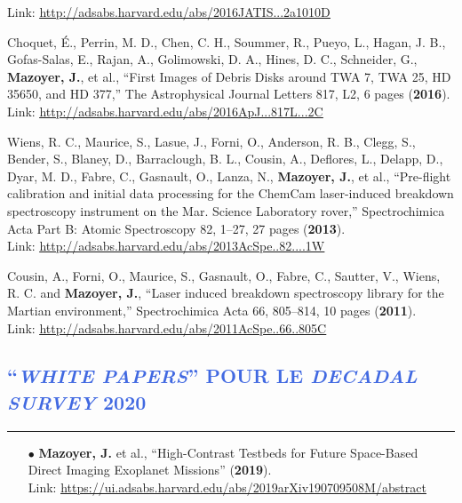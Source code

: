 \documentclass[11pt,a4paper, french]{article}
\begin{document}
\begin{etaremune}
Link: \textcolor{BrickRed}{\underline{\url{http://adsabs.harvard.edu/abs/2016JATIS...2a1010D}}}
\item Choquet, É., Perrin, M. D., Chen, C. H., Soummer, R., Pueyo, L., Hagan, J. B., Gofas-Salas, E., Rajan, A., Golimowski, D. A., Hines, D. C., Schneider, G., \textbf{Mazoyer, J.}, et al., “First Images of Debris Disks around TWA 7, TWA 25, HD 35650, and HD 377,” The Astrophysical Journal Letters 817, L2, 6 pages (\textbf{2016}).\\
    Link: \textcolor{BrickRed}{\underline{\url{http://adsabs.harvard.edu/abs/2016ApJ...817L...2C}}}
\item Wiens, R. C., Maurice, S., Lasue, J., Forni, O., Anderson, R. B., Clegg, S., Bender, S., Blaney, D., Barraclough, B. L., Cousin, A., Deflores, L., Delapp, D., Dyar, M. D., Fabre, C., Gasnault, O., Lanza, N., \textbf{Mazoyer, J.}, et al., “Pre-flight calibration and initial data processing for the ChemCam laser-induced breakdown spectroscopy instrument on the Mar. Science Laboratory rover,” Spectrochimica Acta Part B: Atomic Spectroscopy 82, 1–27, 27 pages (\textbf{2013}).\\
Link: \textcolor{BrickRed}{\underline{\url{http://adsabs.harvard.edu/abs/2013AcSpe..82....1W}}}
\item Cousin, A., Forni, O., Maurice, S., Gasnault, O., Fabre, C., Sautter, V., Wiens, R. C. and \textbf{Mazoyer, J.}, “Laser induced breakdown spectroscopy library for the Martian environment,” Spectrochimica Acta 66, 805–814, 10 pages (\textbf{2011}).\\
Link: \textcolor{BrickRed}{\underline{\url{http://adsabs.harvard.edu/abs/2011AcSpe..66..805C}}}
\end{etaremune}

\vspace{-0.3cm}
\textcolor{RoyalBlue}{\section{\large ``\textit{WHITE PAPERS}'' POUR LE \textit{DECADAL SURVEY} 2020}
\vspace{-0.2cm}\hrule}
\vspace{0.4cm}

\begin{itemize}
    \item[$\bullet$] \textbf{Mazoyer, J.} et al., “High-Contrast Testbeds for Future Space-Based Direct Imaging Exoplanet Missions” (\textbf{2019}).\\
    Link: \textcolor{BrickRed}{\underline{\url{https://ui.adsabs.harvard.edu/abs/2019arXiv190709508M/abstract}}}
\end{itemize}
\end{document}
